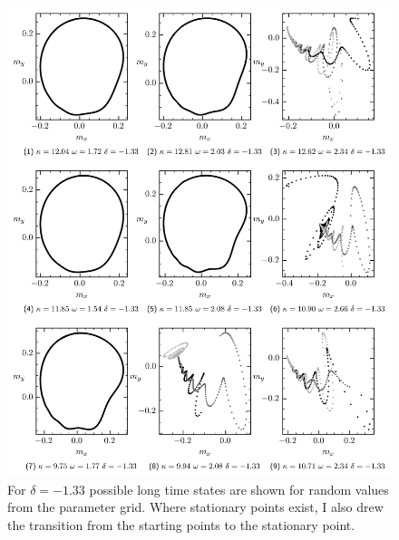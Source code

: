 \begin{appendices}
    \begin{figure}[H]
        \centering
        \includegraphics{pictures/lc_traj_dcut2.png}
        \caption{For $\delta=-1.33$ possible long time states are shown for random values from the parameter grid. Where stationary points exist, I also drew the transition from the starting points to the stationary point.}
    \end{figure}


\end{appendices}
